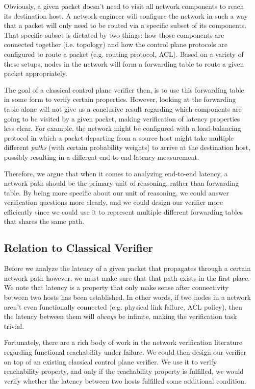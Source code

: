 \documentclass[10pt,sigconf,letterpaper,anonymous,nonacm]{acmart}
\begin{document}
Obviously, a given packet doesn't need to visit all network components to reach its destination 
host.
A network engineer will configure the network in such a way that a packet will only need to be 
routed via a specific subset of its components.
That specific subset is dictated by two things: how those components are connected together 
(i.e. topology) and how the control plane protocols are configured to route a packet (e.g. routing 
protocol, ACL).
Based on a variety of these setups, nodes in the network will form a forwarding table to route a 
given packet appropriately.

The goal of a classical control plane verifier then, is to use this forwarding table in some 
form to verify certain properties. %
However, looking at the forwarding table alone will not give us a conclusive result regarding 
which components are going to be visited by a given packet, making verification of latency 
properties less clear.
For example, the network might be configured with a load-balancing protocol in which a packet 
departing from a source host might take multiple different \textit{paths} (with certain 
probability weights) to arrive at the destination host, possibly resulting in a different 
end-to-end latency measurement.

Therefore, we argue that when it comes to analyzing end-to-end latency, a network path should be 
the primary unit of reasoning, rather than forwarding table.
By being more specific about our unit of reasoning, we could answer verification questions more 
clearly, and we could design our verifier more efficiently since we could use it to represent 
multiple different forwarding tables that shares the same path.

\subsection{Relation to Classical Verifier}
Before we analyze the latency of a given packet that propagates through a certain network 
path however, we must make sure that that path exists in the first place.
We note that latency is a property that only make sense after connectivity between two hosts 
has been established. 
In other words, if two nodes in a network aren't even functionally connected (e.g. physical 
link failure, ACL policy), then the latency between them will \textit{always} be infinite, 
making the verification task trivial.

Fortunately, there are a rich body of work in the network verification literature regarding 
functional reachability under failure. %
We could then design our verifier on top of an existing classical control plane verifier.
We use it to verify reachability property, and only if the reachability property is fulfilled, 
we would verify whether the latency between two hosts fulfilled some additional condition.
\end{document}
